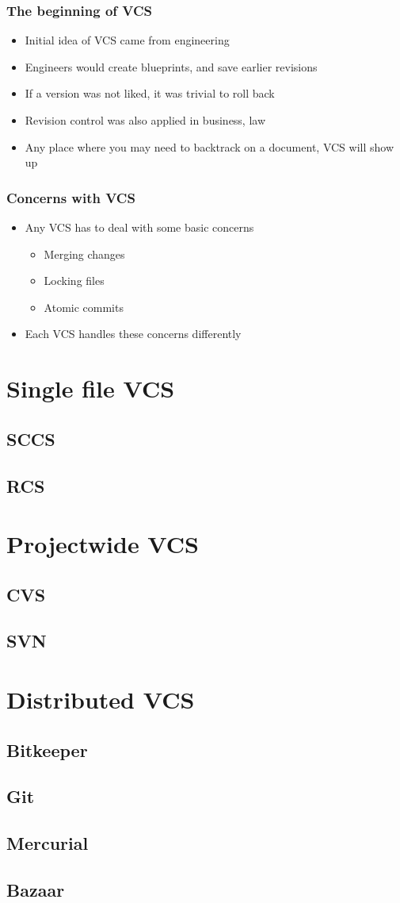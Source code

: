 \documentclass{beamer}
\begin{document}
\begin{frame}
    \frametitle{The beginning of VCS}
    \begin{itemize}
	\item Initial idea of VCS came from engineering
	\item Engineers would create blueprints, and save earlier revisions
	\item If a version was not liked, it was trivial to roll back
	\item Revision control was also applied in business, law
	\item Any place where you may need to backtrack on a document, VCS will show up
    \end{itemize}
\end{frame}

\begin{frame}
    \frametitle{Concerns with VCS}
    \begin{itemize}
	\item Any VCS has to deal with some basic concerns
	\begin{itemize}
	    \item Merging changes
	    \item Locking files
	    \item Atomic commits
	\end{itemize}
	\item Each VCS handles these concerns differently
    \end{itemize}
\end{frame}

\section{Single file VCS}

\subsection{SCCS}
\subsection{RCS}
\section{Projectwide VCS}
\subsection{CVS}
\subsection{SVN}
\section{Distributed VCS}
\subsection{Bitkeeper}
\subsection{Git}
\subsection{Mercurial}
\subsection{Bazaar}
\end{document}
